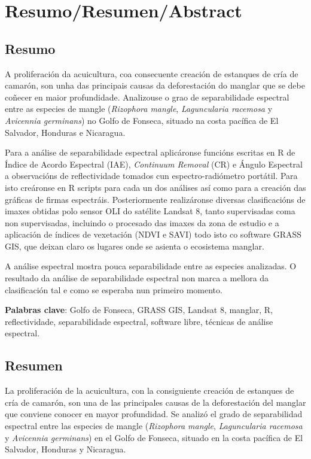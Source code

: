 
\chapter*{Resumo/Resumen/Abstract}
\section*{Resumo}
A proliferación da acuicultura, coa consecuente creación de estanques de cría de camarón, son unha das principais causas da deforestación do manglar que se debe coñecer en maior profundidade. Analizouse o grao de separabilidade espectral entre as especies de mangle (\textit{Rizophora mangle}, \textit{Laguncularia racemosa} y \textit{Avicennia germinans}) no Golfo de Fonseca, situado na costa pacífica de El Salvador, Honduras e Nicaragua.

Para a análise de separabilidade espectral aplicáronse funcións escritas en R de Índice de Acordo Espectral (IAE), \textit{Continuum Removal} (CR) e Ángulo Espectral a observacións de reflectividade tomados cun espectro-radiómetro portátil. Para isto creáronse en R scripts para cada un dos análises así como para a creación das gráficas de firmas espectráis. Posteriormente realizáronse diversas clasificacións de imaxes obtidas polo sensor OLI do satélite Landsat 8, tanto supervisadas coma non supervisadas, incluindo o procesado das imaxes da zona de estudio e a aplicación de índices de vexetación (NDVI e SAVI) todo isto co software GRASS GIS, que deixan claro os lugares onde se asienta o ecosistema manglar.

A análise espectral mostra pouca separabilidade entre as especies analizadas. O resultado da análise de separabilidade espectral non marca a mellora da clasificación tal e como se esperaba nun primeiro momento.

\noindent\textbf{Palabras clave}: Golfo de Fonseca, GRASS GIS, Landsat 8, manglar, R, reflectividade, separabilidade espectral, software libre, técnicas de análise espectral.

\section*{Resumen}
La proliferación de la acuicultura, con la consiguiente creación de estanques de cría de camarón, son una de las principales causas de la deforestación del manglar que conviene conocer en mayor profundidad. Se analizó el grado de separabilidad espectral entre las especies de mangle (\textit{Rizophora mangle}, \textit{Laguncularia racemosa} y \textit{Avicennia germinans}) en el Golfo de Fonseca, situado en la costa pacífica de El Salvador, Honduras y Nicaragua.

